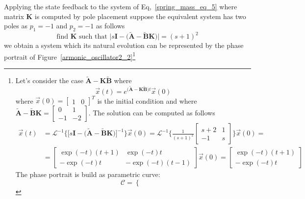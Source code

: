 \documentclass[12pt,a4paper,oneside]{book}
\begin{document}
\begin{onehalfspace}
\begin{example}
	Applying the state feedback to the system of Eq,~\eqref{spring_mass_eq_5} where matrix $\mathbf{K}$ is 
	computed by pole placement suppose the equivalent system has two poles as 
	$p_1=-1$ and $p_2=-1$ as follows
	\begin{equation}
		\text{find }\mathbf{K} \text{ such that 
		}\Big|s\mathbf{I}-\big(\tilde{\mathbf{A}}-\tilde{\mathbf{B}}\mathbf{K}\big)\Big|=(s+1)^2
	\end{equation}
	we obtain a system which its natural evolution can be 
	represented by the phase portrait of Figure~\ref{armonic_oscillator2_2}\footnote{Let's consider the case $\tilde{\mathbf{A}}-\mathbf{K}\tilde{\mathbf{B}}$ where
		\begin{equation}
			\vec{x}(t) = e^{\big(\tilde{\mathbf{A}}-\mathbf{K}\tilde{\mathbf{B}}\big)t}\vec{x}(0)
		\end{equation}
		where $\vec{x}(0)=\begin{bmatrix}
			1&0
		\end{bmatrix}^T$ is the initial condition and where $\tilde{\mathbf{A}}-\tilde{\mathbf{B}}\mathbf{K} = \begin{bmatrix}
			0 & 1 \\ -1 & -2
		\end{bmatrix}$. The solution can be computed as follows
		\begin{equation}
			\begin{aligned}
				\vec{x}(t) &= 
				\mathcal{L}^{-1}\Big\{\Big[s\mathbf{I}-\big(\tilde{\mathbf{A}}-\tilde{\mathbf{B}}\mathbf{K}\big)\Big]^{-1}\Big\}\vec{x}(0)
				= \mathcal{L}^{-1}\Bigg\{\frac{1}{(s+1)^2}\begin{bmatrix} s+2 & 1 \\[6pt] -1 & s 
				\end{bmatrix}\Bigg\}\vec{x}(0) = \\[6pt]
				&= \begin{bmatrix} \exp(-t)(t+1) & \exp(-t)t \\[6pt] -\exp(-t)t & -\exp(-t)(t-1) \end{bmatrix}\vec{x}(0) = \begin{bmatrix} \exp(-t)(t+1) \\[6pt] -\exp(-t)t \end{bmatrix}
			\end{aligned}
		\end{equation}
		The phase portrait is build as parametric curve:
		\begin{equation}
			\mathcal{C}=\left\lbrace \begin{aligned}

\end{aligned}
\end{equation}}
\end{example}
\end{onehalfspace}
\end{document}
